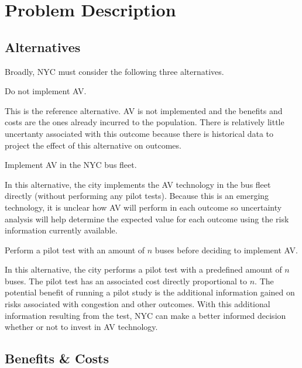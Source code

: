 \documentclass[11pt, letterpaper]{article}
\begin{document}
\section{Problem Description} \label{problem}
\subsection{Alternatives}

Broadly, NYC must consider the following three alternatives.

\begin{description}[leftmargin=0pt]
\item[Alternative 1:] Do not implement AV.

This is the reference alternative. AV is not implemented and the
benefits and costs are the ones already incurred to the population.
There is relatively little uncertanty associated with this outcome
because there is historical data to project the effect of this
alternative on outcomes.

\item[Alternative 2:] Implement AV in the NYC bus fleet.

In this alternative, the city implements the AV technology in the bus
fleet directly (without performing any pilot tests).  Because this is
an emerging technology, it is unclear how AV will perform in each
outcome so uncertainty analysis will help determine the expected value
for each outcome using the risk information currently available.

\item[Alternative 3:] Perform a pilot test with an amount of $n$ buses
  before deciding to implement AV.

In this alternative, the city performs a pilot test with a predefined
amount of $n$ buses. The pilot test has an associated cost directly
proportional to $n$.  The potential benefit of running a pilot study
is the additional information gained on risks associated with
congestion and other outcomes.  With this additional information 
resulting from the test, NYC can make a better informed decision
whether or not to invest in AV technology.

\end{description}

\subsection{Benefits \& Costs}
\end{document}
